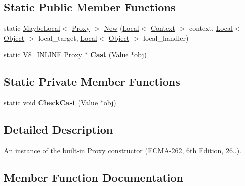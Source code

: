 \subsection*{Static Public Member Functions}
\begin{DoxyCompactItemize}
\item 
static \hyperlink{classv8_1_1_maybe_local}{Maybe\+Local}$<$ \hyperlink{classv8_1_1_proxy}{Proxy} $>$ \hyperlink{classv8_1_1_proxy_a08984acd4a8a94f125afd76b317f66ea}{New} (\hyperlink{classv8_1_1_local}{Local}$<$ \hyperlink{classv8_1_1_context}{Context} $>$ context, \hyperlink{classv8_1_1_local}{Local}$<$ \hyperlink{classv8_1_1_object}{Object} $>$ local\+\_\+target, \hyperlink{classv8_1_1_local}{Local}$<$ \hyperlink{classv8_1_1_object}{Object} $>$ local\+\_\+handler)
\item 
static V8\+\_\+\+I\+N\+L\+I\+NE \hyperlink{classv8_1_1_proxy}{Proxy} $\ast$ {\bfseries Cast} (\hyperlink{classv8_1_1_value}{Value} $\ast$obj)\hypertarget{classv8_1_1_proxy_a6562478fdedab6fa0fe20ede066b2a78}{}\label{classv8_1_1_proxy_a6562478fdedab6fa0fe20ede066b2a78}

\end{DoxyCompactItemize}
\subsection*{Static Private Member Functions}
\begin{DoxyCompactItemize}
\item 
static void {\bfseries Check\+Cast} (\hyperlink{classv8_1_1_value}{Value} $\ast$obj)\hypertarget{classv8_1_1_proxy_a4b644259b25d57fed195e45887068cac}{}\label{classv8_1_1_proxy_a4b644259b25d57fed195e45887068cac}

\end{DoxyCompactItemize}


\subsection{Detailed Description}
An instance of the built-\/in \hyperlink{classv8_1_1_proxy}{Proxy} constructor (E\+C\+M\+A-\/262, 6th Edition, 26..). 

\subsection{Member Function Documentation}
